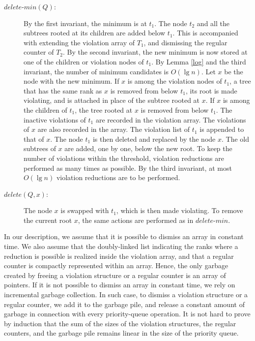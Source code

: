 \documentclass{llncs}
\newcommand{\Deletemin}{\mbox{$\mathit{delete}$\mbox{\rm -}$\mathit{min}$}}
\newcommand{\Delete}{\mbox{$\mathit{delete}$}}
\begin{document}
\begin{description}
\item[\Deletemin{}$(Q)$:] By the first invariant, the minimum is at $t_1$.
	The node $t_2$ and all the subtrees rooted at its 
	children are added below $t_1$. This is accompanied with extending the violation 
	array of $T_1$, and dismissing the regular counter of $T_2$.  
  By the second invariant, the new minimum is now stored at one of the children
  or violation nodes of $t_1$.  By Lemma \ref{log} and the third
  invariant, the number of minimum candidates is $O(\lg{n})$.  Let $x$ be
  the node with the new minimum. If $x$ is among the violation nodes
  of $t_1$, a tree that has the same rank as $x$ is removed from below $t_1$,
  its root is made violating, and is attached in place of the subtree rooted at $x$.
  If $x$ is among the children of $t_1$, the tree rooted at $x$ is removed from below $t_1$. 
  The inactive violations of $t_1$ are recorded in the violation array. The violations of $x$
  are also recorded in the array.  
  The violation list of $t_1$ is appended to that of $x$. 
  The node $t_1$ is then deleted and replaced by the node $x$.
  The old subtrees of $x$ are added, one by one, below the new root.  
  To keep the number of violations within the threshold, violation reductions are performed as many times as possible.
  By the third invariant, at most $O(\lg{n})$ violation reductions are to be performed.

\item[\Delete{}$(Q,x)$:] The node $x$ is swapped with $t_1$, which is then made violating. 
	To remove the current root $x$, the same actions are performed as in \Deletemin{}.
\vspace{-.2in}	
\end{description}
  
In our description, we assume that it is possible to dismiss an array
in constant time.  We also assume that the doubly-linked list indicating
the ranks where a reduction is possible is realized inside the
violation array, and that a regular counter is compactly
represented within an array.  Hence, the only garbage created by
freeing a violation structure or a regular counter is an array of
pointers.  If it is not possible to dismiss an array in constant
time, we rely on incremental garbage collection.  In such case, to
dismiss a violation structure or a regular counter, we add it
to the garbage pile, and release a constant amount of garbage in
connection with every priority-queue operation.  It is not hard to
prove by induction that the sum of the sizes of the violation
structures, the regular counters, and the garbage pile
remains linear in the size of the priority queue.
\end{document}
